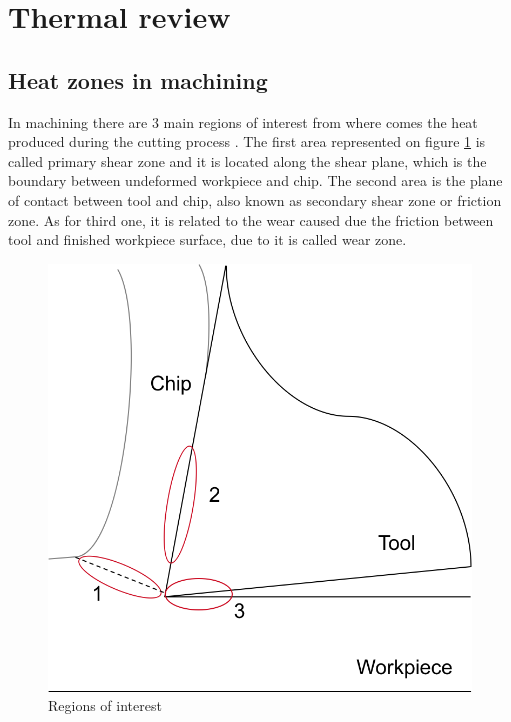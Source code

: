 \section{Thermal review}

	\subsection{Heat zones in machining}

	In machining there are 3 main regions of interest from where comes the heat produced during the cutting process \cite{shaw2005metal}. The first area represented on figure \ref{fig:heatZones} is called primary shear zone and it is located along the shear plane, which is the boundary between undeformed workpiece and chip. The second area is the plane of contact between tool and chip, also known as secondary shear zone or friction zone. As for third one, it is related to the wear caused due the friction between tool and finished workpiece surface, due to it is called wear zone.

	\begin{figure}[h]
		\centering
		\captionsetup{justification=centering}
		\includegraphics[scale=0.5]{Imagens/heatZones.png}
		\caption{Regions of interest}
		\label{fig:heatZones}
	\end{figure}

